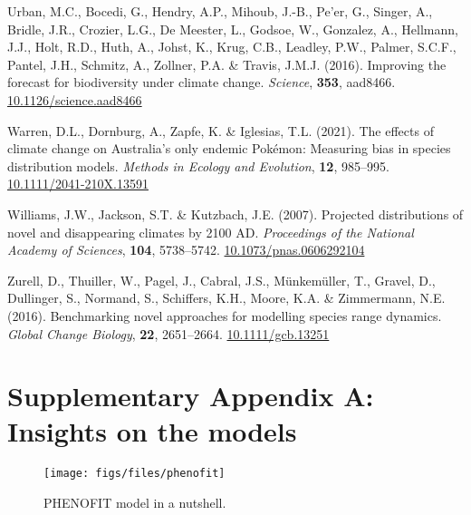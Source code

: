 \documentclass[11pt,]{article}
\newlength{\cslhangindent}
\newenvironment{CSLReferences}[2] %
 {%
  \setlength{\parindent}{0pt}
  \ifodd #1 \everypar{\setlength{\hangindent}{\cslhangindent}}\ignorespaces\fi
  \ifnum #2 > 0
  \setlength{\parskip}{#2\baselineskip}
  \fi
 }%
 {}
\begin{document}
\begin{CSLReferences}{1}{0}
\leavevmode{}%
Urban, M.C., Bocedi, G., Hendry, A.P., Mihoub, J.-B., Pe'er, G., Singer,
A., Bridle, J.R., Crozier, L.G., De Meester, L., Godsoe, W., Gonzalez,
A., Hellmann, J.J., Holt, R.D., Huth, A., Johst, K., Krug, C.B.,
Leadley, P.W., Palmer, S.C.F., Pantel, J.H., Schmitz, A., Zollner, P.A.
\& Travis, J.M.J. (2016). Improving the forecast for biodiversity under
climate change. \emph{Science}, \textbf{353}, aad8466.
\href{https://doi.org/10.1126/science.aad8466}{10.1126/science.aad8466}

\leavevmode{}%
Warren, D.L., Dornburg, A., Zapfe, K. \& Iglesias, T.L. (2021). The
effects of climate change on {Australia}'s only endemic {Pokémon}:
{Measuring} bias in species distribution models. \emph{Methods in
Ecology and Evolution}, \textbf{12}, 985--995.
\href{https://doi.org/10.1111/2041-210X.13591}{10.1111/2041-210X.13591}

\leavevmode{}%
Williams, J.W., Jackson, S.T. \& Kutzbach, J.E. (2007). Projected
distributions of novel and disappearing climates by 2100 {AD}.
\emph{Proceedings of the National Academy of Sciences}, \textbf{104},
5738--5742.
\href{https://doi.org/10.1073/pnas.0606292104}{10.1073/pnas.0606292104}

\leavevmode{}%
Zurell, D., Thuiller, W., Pagel, J., Cabral, J.S., Münkemüller, T.,
Gravel, D., Dullinger, S., Normand, S., Schiffers, K.H., Moore, K.A. \&
Zimmermann, N.E. (2016). Benchmarking novel approaches for modelling
species range dynamics. \emph{Global Change Biology}, \textbf{22},
2651--2664. \href{https://doi.org/10.1111/gcb.13251}{10.1111/gcb.13251}

\end{CSLReferences}

\newpage

\hypertarget{appendixA}{%
\section{Supplementary Appendix A: Insights on the
models}\label{appendixA}}

\renewcommand*\thetable{A.\arabic{table}}
\renewcommand*\thefigure{A.\arabic{figure}}

\setcounter{figure}{0}
\setcounter{table}{0}

\renewcommand*{\thepage}{A--\arabic{page}}

\begin{figure}[htbp]

{\centering \texttt{[image: figs/files/phenofit]} 

}

\caption{PHENOFIT model in a nutshell.}\label{fig:phenofit_model}
\end{figure}
\end{document}
